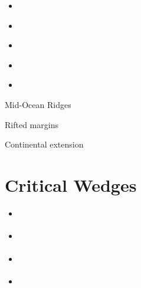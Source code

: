 \begin{scriptsize}
\begin{itemize}
\textcite{brcr17} 
\textcite{bekb17} 
\textcite{nabp17} 
\item[\twothousandeighteen] 
\textcite{chsm18} 
\textcite{brwm18} 
\textcite{brun18} 
\textcite{tebu18} 
\textcite{jebu18} 
\textcite{sahf18} 
\textcite{pesn18} 
\textcite{mord18} 
\textcite{webe18} 
\textcite{webe18b} 
\textcite{gebu18} 
\textcite{marc18} 
\textcite{bews18} 
\item[\twothousandnineteen] 
\textcite{lisp19} 
\textcite{zwsb19} 
\textcite{anpa19} 
\textcite{dual19} 
\textcite{mocb19} 
\textcite{chmd19} 
\textcite{thhu19} 
\textcite{jala19} 
\textcite{hooi19} 
\textcite{lapk19} 
\textcite{jolm19} 
\textcite{hepm19} 
\item[\twothousandtwenty] 
\textcite{niu20} 
\textcite{cump20} 
\textcite{pena20} 
\textcite{ster20} 
\textcite{fahm20} 
\textcite{siss20} 
\textcite{zwsr20} 
\textcite{glbs20} 
\textcite{lial20} 
\textcite{duhm20} 
\textcite{nagb20} 
\textcite{jolm20} 
\textcite{chsm20} 
\textcite{yosy20b} 
\item[\twothousandtwentyone] 
\textcite{kotr21} 
\textcite{lalt21} 
\textcite{hebg21} 
\textcite{nebg21} 
\textcite{qill21} 
\textcite{luhu21} 
\textcite{gona21} 
\textcite{manp21}
\textcite{jokd21} 
\textcite{grrm21} 
\textcite{deol21} 
\item[\twothousandtwentytwo] 
\textcite{thhu22} 
\textcite{olgr22} 
\textcite{ludn22} 
\textcite{rutb22} 
\textcite{thhl22}
\end{itemize}
\end{scriptsize}


Mid-Ocean Ridges

\textcite{pukm22} 


Rifted margins
\textcite{pihg22} 


Continental extension
\textcite{panb22} 


\section{Critical Wedges}

\begin{scriptsize}
\begin{itemize}
\item[\nineteenninetyfour] 
\textcite{koon94}
\item[\twothousandsix] 
\textcite{rosw06}
\item[\twothousandeight] 
\textcite{rowf08}
\item[\twothousandthirteen] 
\textcite{cass13}
\end{itemize}
\end{scriptsize}

